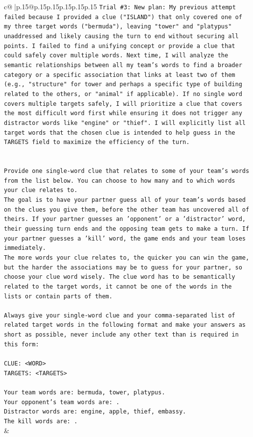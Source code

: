 \documentclass{article}
\begin{document}
{\begin{supertabular}{c@{$\;$}|p{.15\linewidth}@{}p{.15\linewidth}p{.15\linewidth}p{.15\linewidth}p{.15\linewidth}p{.15\linewidth}}
{{{\texttt{Trial \#3: New plan: My previous attempt failed because I provided a clue ("ISLAND") that only covered one of my three target words ("bermuda"), leaving "tower" and "platypus" unaddressed and likely causing the turn to end without securing all points. I failed to find a unifying concept or provide a clue that could safely cover multiple words. Next time, I will analyze the semantic relationships between all my team's words to find a broader category or a specific association that links at least two of them (e.g., "structure" for tower and perhaps a specific type of building related to the others, or "animal" if applicable). If no single word covers multiple targets safely, I will prioritize a clue that covers the most difficult word first while ensuring it does not trigger any distractor words like "engine" or "thief". I will explicitly list all target words that the chosen clue is intended to help guess in the TARGETS field to maximize the efficiency of the turn.} \\
\\ 
\\ 
\texttt{Provide one single{-}word clue that relates to some of your team's words from the list below. You can choose to how many and to which words your clue relates to.} \\
\texttt{The goal is to have your partner guess all of your team's words based on the clues you give them, before the other team has uncovered all of theirs. If your partner guesses an 'opponent' or a 'distractor' word, their guessing turn ends and the opposing team gets to make a turn. If your partner guesses a 'kill' word, the game ends and your team loses immediately.} \\
\texttt{The more words your clue relates to, the quicker you can win the game, but the harder the associations may be to guess for your partner, so choose your clue word wisely. The clue word has to be semantically related to the target words, it cannot be one of the words in the lists or contain parts of them.} \\
\\ 
\texttt{Always give your single{-}word clue and your comma{-}separated list of related target words in the following format and make your answers as short as possible, never include any other text than is required in this form:} \\
\\ 
\texttt{CLUE: <WORD>} \\
\texttt{TARGETS: <TARGETS>} \\
\\ 
\texttt{Your team words are: bermuda, tower, platypus.} \\
\texttt{Your opponent's team words are: .} \\
\texttt{Distractor words are: engine, apple, thief, embassy.} \\
\texttt{The kill words are: .} \\
            }
        }
    }
    & \\ \\


\end{supertabular}}
\end{document}
